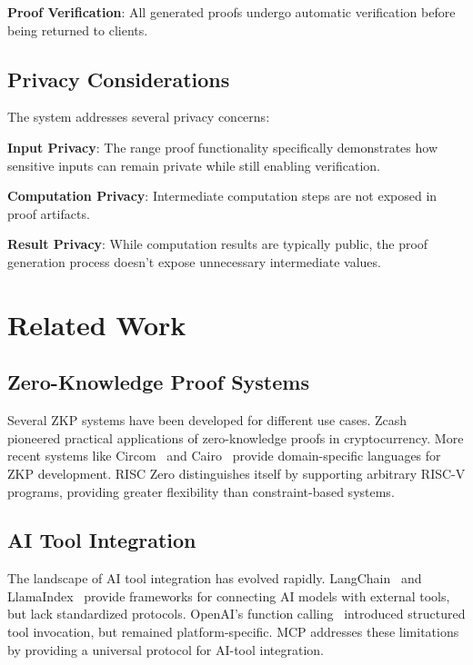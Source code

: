 \documentclass[11pt]{article}
\begin{document}
\textbf{Proof Verification}: All generated proofs undergo automatic verification before being returned to clients.

\subsection{Privacy Considerations}

The system addresses several privacy concerns:

\textbf{Input Privacy}: The range proof functionality specifically demonstrates how sensitive inputs can remain private while still enabling verification.

\textbf{Computation Privacy}: Intermediate computation steps are not exposed in proof artifacts.

\textbf{Result Privacy}: While computation results are typically public, the proof generation process doesn't expose unnecessary intermediate values.

\section{Related Work}
\label{sec:related}

\subsection{Zero-Knowledge Proof Systems}

Several ZKP systems have been developed for different use cases. Zcash~\cite{zcash} pioneered practical applications of zero-knowledge proofs in cryptocurrency. More recent systems like Circom~\cite{circom} and Cairo~\cite{cairo} provide domain-specific languages for ZKP development. RISC Zero distinguishes itself by supporting arbitrary RISC-V programs, providing greater flexibility than constraint-based systems.

\subsection{AI Tool Integration}

The landscape of AI tool integration has evolved rapidly. LangChain~\cite{langchain} and LlamaIndex~\cite{llamaindex} provide frameworks for connecting AI models with external tools, but lack standardized protocols. OpenAI's function calling~\cite{openai_functions} introduced structured tool invocation, but remained platform-specific. MCP addresses these limitations by providing a universal protocol for AI-tool integration.
\end{document}
